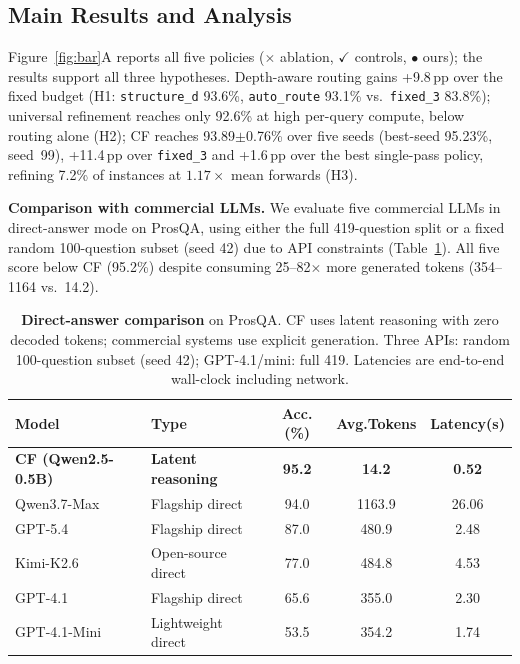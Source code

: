 \documentclass{article}
\theoremstyle{compactthm}
\theoremstyle{compactdef}
\begin{document}
\subsection{Main Results and Analysis}
\label{sec:main}
Figure~\ref{fig:bar}A reports all five policies ($\times$ ablation, $\checkmark$ controls, $\bullet$ ours); the results support all three hypotheses. Depth-aware routing gains +9.8\,pp over the fixed budget (H1: \texttt{structure\_d} 93.6\%, \texttt{auto\_route} 93.1\% vs.\ \texttt{fixed\_3} 83.8\%); universal refinement reaches only 92.6\% at high per-query compute, below routing alone (H2); CF reaches 93.89$\pm$0.76\% over five seeds (best-seed 95.23\%, seed~99), +11.4\,pp over \texttt{fixed\_3} and +1.6\,pp over the best single-pass policy, refining 7.2\% of instances at $1.17\times$ mean forwards (H3).


\textbf{Comparison with commercial LLMs.} We evaluate five commercial LLMs in direct-answer mode on ProsQA, using either the full 419-question split or a fixed random 100-question subset (seed 42) due to API constraints (Table~\ref{tab:market}). All five score below CF (95.2\%) despite consuming 25--82$\times$ more generated tokens (354--1164 vs.\ 14.2).

\begin{table}[t]
  \centering
  \caption{\textbf{Direct-answer comparison} on ProsQA. CF uses latent reasoning with zero decoded tokens; commercial systems use explicit generation. Three APIs: random 100-question subset (seed 42); GPT-4.1/mini: full 419. Latencies are end-to-end wall-clock including network.}
  \label{tab:market}
  \footnotesize
  \begin{tabular}{llccc}
    \toprule
    Model & Type & Acc.(\%) & Avg.Tokens & Latency(s) \\
    \midrule
    \textbf{CF (Qwen2.5-0.5B)} & \textbf{Latent reasoning} & \textbf{95.2} & \textbf{14.2} & \textbf{0.52} \\
    \midrule
    Qwen3.7-Max & Flagship direct & 94.0 & 1163.9 & 26.06 \\
    GPT-5.4 & Flagship direct & 87.0 & 480.9 & 2.48 \\
    Kimi-K2.6 & Open-source direct & 77.0 & 484.8 & 4.53 \\
    GPT-4.1 & Flagship direct & 65.6 & 355.0 & 2.30 \\
    GPT-4.1-Mini & Lightweight direct & 53.5 & 354.2 & 1.74 \\
    \bottomrule
  \end{tabular}
\end{table}
\end{document}
